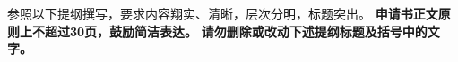 \documentclass[GP]{nsfc}
\begin{document}
\maketitle

{\kaishu\enkai\fontsize{14pt}{15pt}\selectfont
参照以下提纲撰写，要求内容翔实、清晰，层次分明，标题突出。
\textbf{\color{NSFCred}申请书正文原则上不超过30页，鼓励简洁表达。}
\textbf{\color{NSFCblue}请勿删除或改动下述提纲标题及括号中的文字。}\par
\vspace{-3pt}}




\renewcommand{\bibname}{\color{black}\normalfont\normalsize\bfseries 参考文献}


\clearpage


\end{document}
